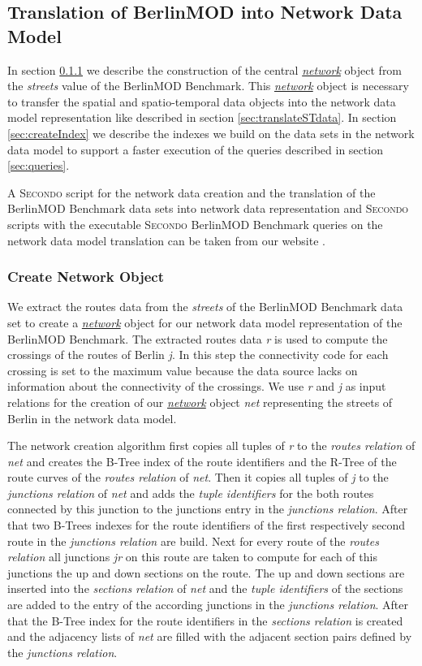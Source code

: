 \documentclass[a4paper]{article}
\newcommand{\secondo}{\textsc{Secondo}}
\newcommand{\bmodb} {BerlinMOD Benchmark}
\newcommand{\var}[1]{\textsl{#1}}
\newcommand{\dt}[1]{\textsl{\underline{#1}}}
\begin{document}
{\subsection{Translation of BerlinMOD into Network Data Model}
\label{sec:Translation}
In section \ref{sec:createNetwork} we describe the construction of the central \dt{network} object from the \var{streets} value of the \bmodb{}. This \dt{network} object is necessary to transfer the spatial and spatio-temporal data objects into the network data model representation like described in section \ref{sec:translateSTdata}. In section \ref{sec:createIndex} we describe the indexes we build on the data sets in the network data model to support a faster execution of the queries described in section \ref{sec:queries}.

A \secondo{} script for the network data creation and the translation of the \bmodb{} data sets into network data representation and \secondo{} scripts with the executable \secondo{} \bmodb{} queries on the network data model translation can be taken from our website \cite{berlinmodweb}.
\subsubsection{Create Network Object}
\label{sec:createNetwork}
We extract the routes data from the \var{streets} of the \bmodb{} data set to create a \dt{network} object for our network data model representation of the \bmodb{}. The extracted routes data \var{r} is used to compute the crossings of the routes of Berlin \var{j}. In this step the connectivity code for each crossing is set to the maximum value because the data source lacks on information about the connectivity of the crossings. We use \var{r} and \var{j} as input relations for the creation of our \dt{network} object \var{net} representing the streets of Berlin in the network data model.

The network creation algorithm first copies all tuples of \var{r} to the \var{routes relation} of \var{net} and creates the B-Tree index of the route identifiers and the R-Tree of the route curves of the \var{routes relation} of \var{net}. Then it copies all tuples of \var{j} to the \var{junctions relation} of \var{net} and adds the \var{tuple identifiers} for the both routes connected by this junction to the junctions entry in the \var{junctions relation}. After that two B-Trees indexes for the route identifiers of the first respectively second route in the \var{junctions relation} are build. Next for every route of the \var{routes relation} all junctions \var{jr} on this route are taken to compute for each of this junctions the up and down sections on the route. The up and down sections are inserted into the \var{sections relation} of \var{net} and the \var{tuple identifiers} of the sections are added to the entry of the according junctions in the \var{junctions relation}. After that the B-Tree index for the route identifiers in the \var{sections relation} is created and the  adjacency lists of \var{net} are filled with the adjacent section pairs defined by the \var{junctions relation}.

}
\end{document}
